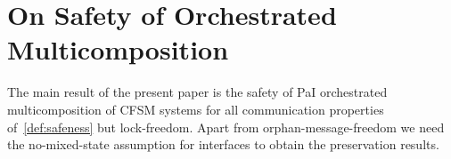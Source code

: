 


\section{On Safety of Orchestrated Multicomposition }
\label{sec:preservation}


The main result of the present paper is the safety of PaI orchestrated multicomposition of CFSM 
systems for all communication properties of~\cref{def:safeness} but lock-freedom.
Apart from orphan-message-freedom we need the no-mixed-state assumption for interfaces to obtain the preservation results.

%


